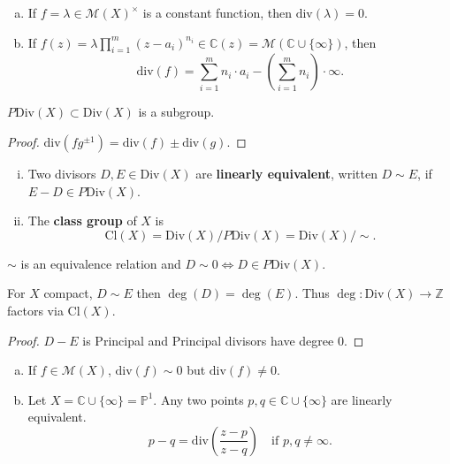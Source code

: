 \documentclass{article}
\begin{document}
\begin{example}
    \begin{enumerate}[(a)]
        \item If $f = \lambda \in \mathcal{M}(X)^\times$ is a constant function, then $\text{div}(\lambda) = 0$.
        \item If $f(z) = \lambda \prod_{i=1}^m (z-a_i)^{n_i} \in \mathbb{C}(z) = \mathcal{M}(\mathbb{C} \cup \{\infty\})$, then
        $$\text{div}(f) = \sum_{i=1}^m n_i \cdot a_i - \left(\sum_{i=1}^m n_i\right) \cdot \infty.$$
    \end{enumerate}
\end{example}

\begin{lemma}
    $P\text{Div}(X) \subset \text{Div}(X)$ is a subgroup.
\end{lemma}
\begin{proof}
    $\text{div}(fg^{\pm 1}) = \text{div}(f) \pm \text{div}(g)$.
\end{proof}

\begin{definition}
    \begin{enumerate}[(i)]
        \item Two divisors $D, E \in \text{Div}(X)$ are \textbf{linearly equivalent}, written $D \sim E$,
        if $E - D \in P\text{Div}(X)$.
        \item The \textbf{class group} of $X$ is
        $$\text{Cl}(X) = \text{Div}(X) / P\text{Div}(X) = \text{Div}(X) / \sim.$$
    \end{enumerate}
\end{definition}

\begin{remark}
    $\sim$ is an equivalence relation and $D \sim 0 \iff D \in P\text{Div}(X)$.
\end{remark}

\begin{lemma}
    For $X$ compact, $D \sim E$ then $\deg(D) = \deg(E)$.
    Thus $\deg: \text{Div}(X) \to \mathbb{Z}$ factors via $\text{Cl}(X)$.
\end{lemma}
\begin{proof}
    $D - E$ is Principal and Principal divisors have degree $0$.
\end{proof}

\begin{example}
    \begin{enumerate}[(a)]
        \item If $f \in \mathcal{M}(X)$, $\text{div}(f) \sim 0$ but $\text{div}(f) \neq 0$.
        \item Let $X = \mathbb{C} \cup \{\infty\} = \mathbb{P}^1$. Any two points $p, q \in \mathbb{C} \cup \{\infty\}$ are linearly equivalent.
        $$p - q = \text{div} \left(\frac{z - p}{z - q}\right) \quad \text{if } p, q \neq \infty.$$
    \end{enumerate}
\end{example}
\end{document}
